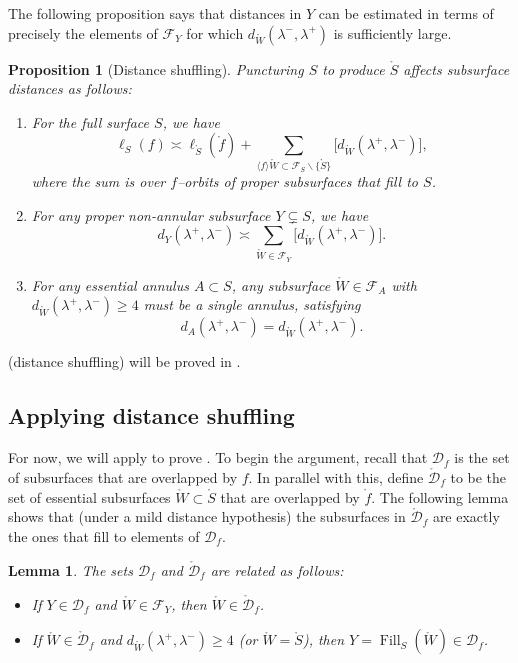 \documentclass[11pt,letterpaper]{amsart}
\newcommand{\Fill}{\operatorname{Fill}}
\newcommand{\mc}{\mathcal}
\newcommand{\mr}{\mathring}
\newcommand{\psub}{\mr W}
\numberwithin{equation}{section}
\newtheorem{lemma}[theorem]{Lemma}
\newtheorem{proposition}[theorem]{Proposition}
\theoremstyle{definition}
\renewcommand{\setminus}{\smallsetminus}
\begin{document}
The following proposition says that distances in $Y$ can be estimated in terms of  precisely the elements of  $\mc F_Y$ for which $d_{\psub}(\lambda^-, \lambda^+)$ is sufficiently large.

\begin{proposition}[Distance shuffling]
\label{Prop:Shuffling}
Puncturing $S$ to produce $\mr S$ affects subsurface distances as follows:
\begin{enumerate}
\item \label{Itm:FullSurfShuffling}
For the full surface $S$, we have
\[
\ell_{S}(f) \asymp \ell_{\mr S}(\mr f) + \sum_{\langle f \rangle \psub \subset \mc F_S \setminus \{\mr S\}} \big[ d_{\psub}(\lambda^+,\lambda^-) \big],
\]
where the sum is over $f$--orbits of proper subsurfaces that fill to $S$.
\item \label{Itm:ProperSubsurfShuffling}
For any proper non-annular subsurface $Y \subsetneq S$, we have
\[
d_Y(\lambda^+, \lambda^-) \asymp \sum_{\psub \in \mc F_Y} \big[ d_{\psub}(\lambda^+,\lambda^-) \big].
\]
\item \label{Itm:AnnulusShuffling}
For any essential annulus $A \subset S$, any subsurface  $\psub \in \mc F_A$ with $d_{\psub}(\lambda^+,\lambda^-) \geq 4$ must be a single annulus, satisfying
\[
d_A(\lambda^+, \lambda^-) = d_{\psub}(\lambda^+, \lambda^-).
\]
\end{enumerate}
\end{proposition}




  (distance shuffling) will be proved in .


\subsection{Applying distance shuffling}
For now, we will apply   to prove  . 
To begin the argument, recall that $\mc D_f$ is the set of 
subsurfaces that are overlapped by $f$. 
In parallel with this, define $\mr {\mc D}_f$ to be the set of essential subsurfaces $\psub \subset \mr S$ 
that are overlapped by $\mr f$.
The following lemma shows that (under a mild distance hypothesis) the subsurfaces in $\mr {\mc D}_f$ are exactly the ones that fill to elements of $\mc D_f$.


\begin{lemma}\label{Lem:FillingOverlap}
The sets $\mc D_f$ and $\mr {\mc D}_f$ are related as follows:
\begin{itemize}
\item If $Y \in \mc D_f$ and $\psub \in \mc F_Y$, then $\psub \in \mr {\mc D}_f$.
\item If $\psub \in \mr {\mc D}_f$ and  $d_{\psub}(\lambda^+,\lambda^-) \geq 4$ (or $\psub = \mr S$), then $Y = \Fill_S(\psub)  \in \mc D_f $.
\end{itemize}
\end{lemma}
\end{document}

